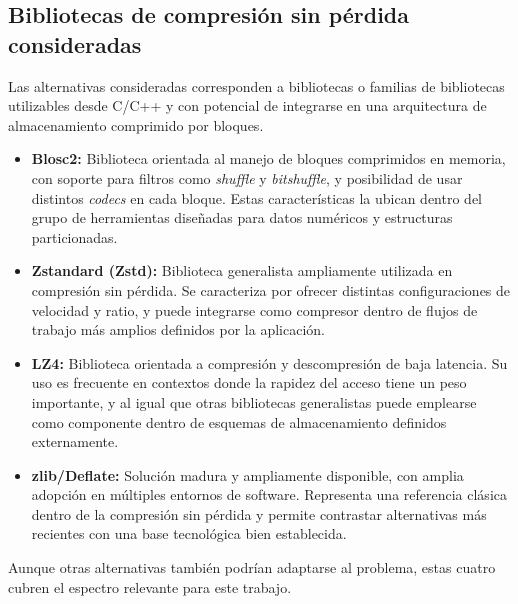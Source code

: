 \subsection{Bibliotecas de compresión sin pérdida consideradas}

Las alternativas consideradas corresponden a bibliotecas o familias de bibliotecas utilizables desde C/C++ y
con potencial de integrarse en una arquitectura de almacenamiento comprimido por bloques.

\begin{itemize}
    \item \textbf{Blosc2:} Biblioteca orientada al manejo de bloques comprimidos en memoria, con soporte para filtros
    como \emph{shuffle} y \emph{bitshuffle}, y posibilidad de usar distintos \emph{codecs} en cada bloque. Estas
    características la ubican dentro del grupo de herramientas diseñadas para datos numéricos y estructuras particionadas.

    \item \textbf{Zstandard (Zstd):} Biblioteca generalista ampliamente utilizada en compresión sin pérdida. Se caracteriza
    por ofrecer distintas configuraciones de velocidad y ratio, y puede integrarse como compresor dentro de flujos de trabajo
    más amplios definidos por la aplicación.

    \item \textbf{LZ4:} Biblioteca orientada a compresión y descompresión de baja latencia. Su uso es frecuente en contextos
    donde la rapidez del acceso tiene un peso importante, y al igual que otras bibliotecas generalistas puede emplearse como
    componente dentro de esquemas de almacenamiento definidos externamente.

    \item \textbf{zlib/Deflate:} Solución madura y ampliamente disponible, con amplia adopción en múltiples entornos de
    software. Representa una referencia clásica dentro de la compresión sin pérdida y permite contrastar alternativas más
    recientes con una base tecnológica bien establecida.
\end{itemize}

Aunque otras alternativas también podrían adaptarse al problema, estas cuatro cubren el espectro relevante para este trabajo.
